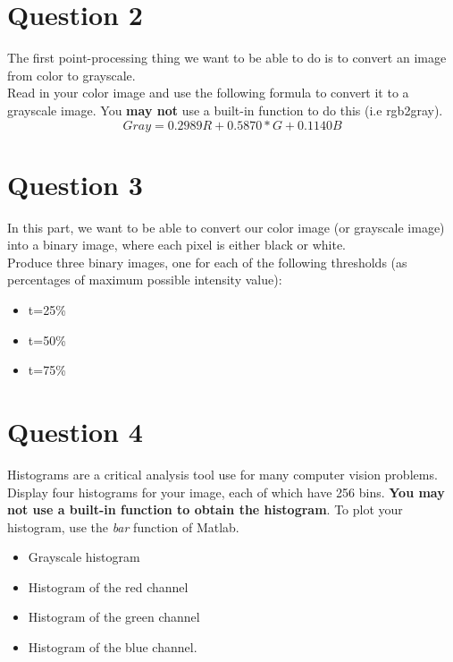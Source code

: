 \documentclass{article}
\begin{document}
\section*{Question 2}
The first point-processing thing we want to be able to do is to convert an image from color to grayscale.\\

\noindent
Read in your color image and use the following formula to convert it to a grayscale image.  You \textbf{may not} use a built-in function to do this (i.e rgb2gray).\\

\begin{equation}
Gray=0.2989R+0.5870*G+0.1140B
\end{equation}


\section*{Question 3}
In this part, we want to be able to convert our color image (or grayscale image) into a binary image, where each pixel is either black or white.\\

\noindent
Produce three binary images, one for each of the following thresholds (as percentages of maximum possible intensity value):
\begin{itemize}
\item t=25\%
\item t=50\%
\item t=75\%
\end{itemize}


\section*{Question 4}
Histograms are a critical analysis tool use for many computer vision problems.  Display four histograms for your image, each of which have 256 bins.  \textbf{You may not use a built-in function to obtain the histogram}.  To plot your histogram, use the \emph{bar} function of Matlab.

\begin{itemize}
\item Grayscale histogram
\item Histogram of the red channel
\item Histogram of the green channel
\item Histogram of the blue channel.
\end{itemize}
\end{document}
